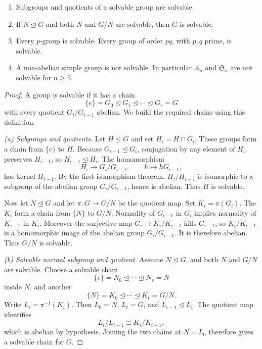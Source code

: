 \begin{proposition}\label{prop:solv}
\begin{enumerate}[label=(\alph*)]
\item Subgroups and quotients of a solvable group are solvable.
\item If $N\trianglelefteq G$ and both $N$ and $G/N$ are solvable, then $G$ is solvable.
\item Every $p$-group is solvable. Every group of order $pq$, with $p,q$ prime, is solvable.
\item A non-abelian simple group is not solvable. In particular $A_n$ and $\mathfrak S_n$ are not solvable for $n\ge5$.
\end{enumerate}
\end{proposition}
\begin{proof}
A group is solvable if it has a chain
\[
\{e\}=G_0\trianglelefteq G_1
\trianglelefteq\cdots\trianglelefteq G_r=G
\]
with every quotient $G_i/G_{i-1}$ abelian.
We build the required chains using this definition.

\emph{(a) Subgroups and quotients.}
Let $H\le G$ and set $H_i=H\cap G_i$.
These groups form a chain from $\{e\}$ to $H$.
Because $G_{i-1}\trianglelefteq G_i$,
conjugation by any element of $H_i$
preserves $H_{i-1}$, so
$H_{i-1}\trianglelefteq H_i$.
The homomorphism
\[
H_i\to G_i/G_{i-1},
\qquad h\mapsto hG_{i-1},
\]
has kernel $H_{i-1}$. By the first
isomorphism theorem, $H_i/H_{i-1}$
is isomorphic to a subgroup of
the abelian group $G_i/G_{i-1}$,
hence is abelian. Thus $H$ is solvable.

Now let $N\trianglelefteq G$ and let
$\pi:G\to G/N$ be the quotient map.
Set $K_i=\pi(G_i)$. The $K_i$ form a
chain from $\{N\}$ to $G/N$.
Normality of $G_{i-1}$ in $G_i$
implies normality of $K_{i-1}$ in $K_i$.
Moreover the surjective map
$G_i\to K_i/K_{i-1}$ kills $G_{i-1}$,
so $K_i/K_{i-1}$ is a homomorphic
image of the abelian group $G_i/G_{i-1}$.
It is therefore abelian. Thus $G/N$
is solvable.

\emph{(b) Solvable normal subgroup and quotient.}
Assume $N\trianglelefteq G$, and both
$N$ and $G/N$ are solvable. Choose a
solvable chain
\[
\{e\}=N_0\trianglelefteq\cdots
\trianglelefteq N_s=N
\]
inside $N$, and another
\[
\{N\}=K_0\trianglelefteq\cdots
\trianglelefteq K_t=G/N.
\]
Write $L_i=\pi^{-1}(K_i)$.
Then $L_0=N$, $L_t=G$, and
$L_{i-1}\trianglelefteq L_i$.
The quotient map identifies
\[
L_i/L_{i-1}\cong K_i/K_{i-1},
\]
which is abelian by hypothesis.
Joining the two chains at $N=L_0$
therefore gives a solvable chain for $G$.


\end{proof}
